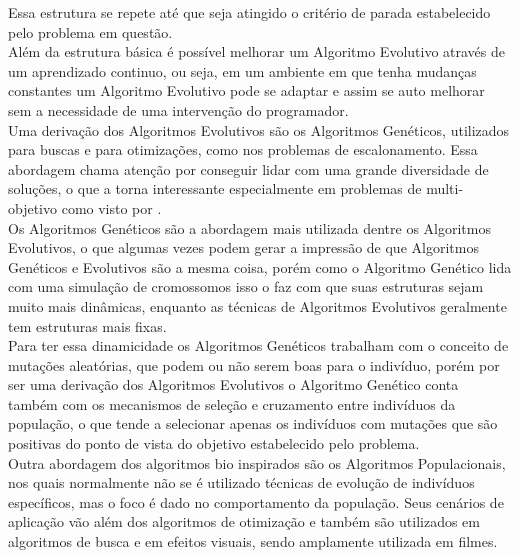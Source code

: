Essa estrutura se repete até que seja atingido o critério de parada estabelecido pelo problema em questão.\\
\indent Além da estrutura básica é possível melhorar um Algoritmo Evolutivo através de um aprendizado continuo, ou seja, em um ambiente em que tenha mudanças constantes um Algoritmo Evolutivo pode se adaptar e assim se auto melhorar sem a necessidade de uma intervenção do programador.\\
\indent Uma derivação dos Algoritmos Evolutivos são os Algoritmos Genéticos, utilizados para buscas e para otimizações, como nos problemas de escalonamento.
%
Essa abordagem chama atenção por conseguir lidar com uma grande diversidade de soluções, o que a torna interessante especialmente em problemas de multi-objetivo como visto por \cite{Bagchi1999}.\\
\indent Os Algoritmos Genéticos são a abordagem mais utilizada dentre os Algoritmos Evolutivos, o que algumas vezes podem gerar a impressão de que Algoritmos Genéticos e Evolutivos são a mesma coisa, porém como o Algoritmo Genético lida com uma simulação de cromossomos isso o faz com que suas estruturas sejam muito mais dinâmicas, enquanto as técnicas de Algoritmos Evolutivos geralmente tem estruturas mais fixas.\\
%
\indent Para ter essa dinamicidade os Algoritmos Genéticos trabalham com o conceito de mutações aleatórias, que podem ou não serem boas para o indivíduo, porém por ser uma derivação dos Algoritmos Evolutivos o Algoritmo Genético conta também com os mecanismos de seleção e cruzamento entre indivíduos da população, o que tende a selecionar apenas os indivíduos com mutações que são positivas do ponto de vista do objetivo estabelecido pelo problema.\\
\indent Outra abordagem dos algoritmos bio inspirados são os Algoritmos Populacionais, nos quais normalmente não se é utilizado técnicas de evolução de indivíduos específicos, mas o foco é dado no comportamento da população. 
%
Seus cenários de aplicação vão além dos algoritmos de otimização e também são utilizados em algoritmos de busca e em efeitos visuais, sendo amplamente utilizada em filmes. 

